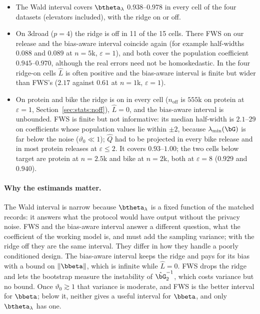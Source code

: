 \begin{itemize}
  \item The Wald interval covers $\btheta_\lambda$ $0.938$--$0.978$ in every cell of the four datasets (elevators included), with the ridge on or off.
  \item On 3droad ($p = 4$) the ridge is off in 11 of the 15 cells. There FWS on our release and the bias-aware interval coincide again (for example half-widths $0.088$ and $0.089$ at $n = 5$k, $\varepsilon = 1$), and both cover the population coefficient $0.945$--$0.970$, although the real errors need not be homoskedastic. In the four ridge-on cells $\hat L$ is often positive and the bias-aware interval is finite but wider than FWS's ($2.17$ against $0.61$ at $n = 1$k, $\varepsilon = 1$).
  \item On protein and bike the ridge is on in every cell ($n_{\mathrm{off}}$ is $555$k on protein at $\varepsilon = 1$, Section~\ref{sec:stats:noff}), $\hat L = 0$, and the bias-aware interval is unbounded. FWS is finite but not informative: its median half-width is $2.1$--$29$ on coefficients whose population values lie within $\pm 2$, because $\lambda_{\min}(\bG)$ is far below the noise ($\vartheta_0 \ll 1$); $\hat Q$ had to be projected in every bike release and in most protein releases at $\varepsilon \le 2$. It covers $0.93$--$1.00$; the two cells below target are protein at $n = 2.5$k and bike at $n = 2$k, both at $\varepsilon = 8$ ($0.929$ and $0.940$).
\end{itemize}

\paragraph{Why the estimands matter.} The Wald interval is narrow because $\btheta_\lambda$ is a fixed function of the matched records: it answers what the protocol would have output without the privacy noise. FWS and the bias-aware interval answer a different question, what the coefficient of the working model is, and must add the sampling variance; with the ridge off they are the same interval. They differ in how they handle a poorly conditioned design. The bias-aware interval keeps the ridge and pays for its bias with a bound on $\|\bbeta\|$, which is infinite while $\hat L = 0$. FWS drops the ridge and lets the bootstrap measure the instability of $\hat\bG_2^{-1}$, which costs variance but no bound. Once $\vartheta_0 \gtrsim 1$ that variance is moderate, and FWS is the better interval for $\bbeta$; below it, neither gives a useful interval for $\bbeta$, and only $\btheta_\lambda$ has one.

